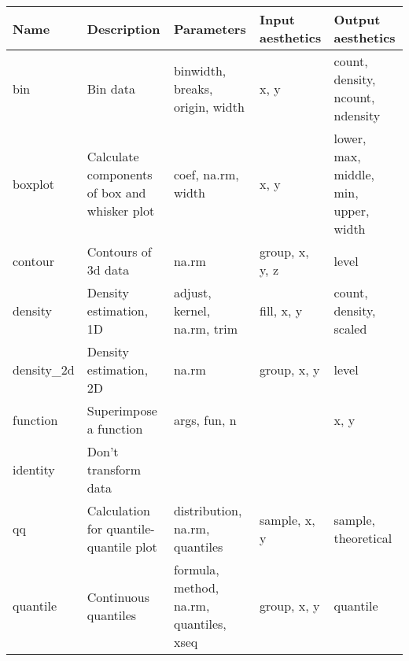 \begin{table}
  \begin{center}
  \begin{tabular}{lp{1.5in}p{2in}p{1in}p{1.5in}}
    \toprule
    Name & Description & Parameters & Input \newline aesthetics & Output \newline aesthetics \\
    \midrule
    bin          & Bin data                                                    & binwidth, breaks, origin, width                & x, y                            & count, density, ncount, ndensity     \\
    boxplot      & Calculate components of box and whisker plot                & coef, na.rm, width                             & x, y                            & lower, max, middle, min, upper, width\\
    contour      & Contours of 3d data                                         & na.rm                                          & group, x, y, z                  & level                                \\
    density      & Density estimation, 1D                                      & adjust, kernel, na.rm, trim                    & fill, x, y                      & count, density, scaled               \\
    density\_2d & Density estimation, 2D                                      & na.rm                                          & group, x, y                     & level                                \\
    function     & Superimpose a function                                      & args, fun, n                                   &                                 & x, y                                 \\
    identity     & Don't transform data                                        &                                                &                                 &                                      \\
    qq           & Calculation for quantile-quantile plot                      & distribution, na.rm, quantiles                 & sample, x, y                    & sample, theoretical                  \\
    quantile     & Continuous quantiles                                        & formula, method, na.rm, quantiles, xseq        & group, x, y                     & quantile                             \\

\end{tabular}
\end{center}
\end{table}
